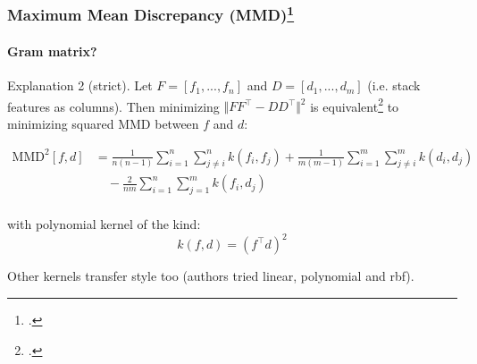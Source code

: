 \documentclass[10pt]{beamer}
\begin{document}
\begin{frame}
\frametitle{Maximum Mean Discrepancy (MMD)\footcite{MMD}}
\framesubtitle{Gram matrix?}
Explanation 2 (strict). Let $F = [f_1, ..., f_n]$ and $D = [d_1, ..., d_m]$ (i.e. stack features as columns). Then minimizing $\Vert FF^\top - DD^\top \Vert^2$ is equivalent\footcite{DemystifyingNeuralStyle} to minimizing squared MMD between $f$ and $d$:

\begin{equation*}
\begin{split}
\text{MMD}^2[f, d] &= \frac{1}{n(n-1)} \sum_{i=1}^n \sum_{j\neq i}^n k(f_i, f_j) + \frac{1}{m(m-1)} \sum_{i=1}^m \sum_{j\neq i}^m k(d_i, d_j) \\
& \quad-\frac{2}{nm} \sum_{i=1}^n \sum_{j=1}^m k(f_i, d_j) \\
\end{split}
\end{equation*}

with polynomial kernel of the kind:
\[
k(f, d) = (f^\top d)^2
\]

Other kernels transfer style too (authors tried linear, polynomial and rbf).
\end{frame}


%
%
%
\end{document}
